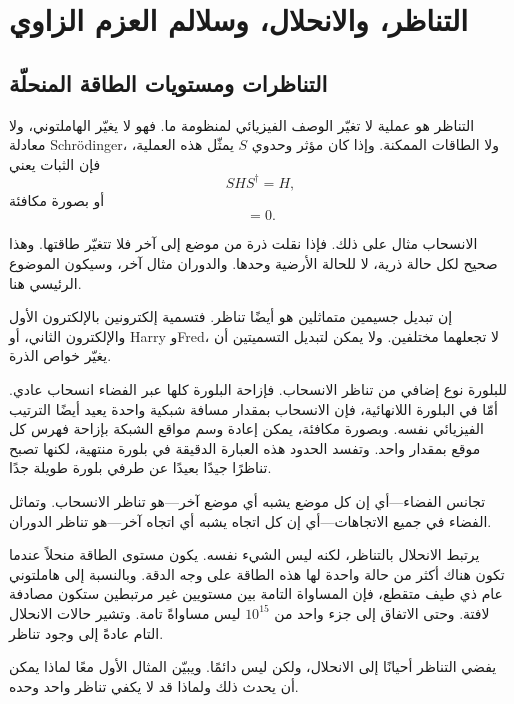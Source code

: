 \chapter{التناظر، والانحلال، وسلالم العزم الزاوي}
\providecommand{\ket}[1]{\left\lvert#1\right\rangle}

\section{التناظرات ومستويات الطاقة المنحلّة}

التناظر هو عملية لا تغيّر الوصف الفيزيائي لمنظومة ما. فهو لا يغيّر الهاملتوني، ولا معادلة Schr\"odinger، ولا الطاقات الممكنة. وإذا كان مؤثر وحدوي \(S\) يمثّل هذه العملية، فإن الثبات يعني
\begin{equation}
S H S^\dagger=H,
\end{equation}
أو بصورة مكافئة
\begin{equation}
[S,H]=0.
\end{equation}

الانسحاب مثال على ذلك. فإذا نقلت ذرة من موضع إلى آخر فلا تتغيّر طاقتها. وهذا صحيح لكل حالة ذرية، لا للحالة الأرضية وحدها. والدوران مثال آخر، وسيكون الموضوع الرئيسي هنا.

إن تبديل جسيمين متماثلين هو أيضًا تناظر. فتسمية إلكترونين بالإلكترون الأول والإلكترون الثاني، أو Harry وFred، لا تجعلهما مختلفين. ولا يمكن لتبديل التسميتين أن يغيّر خواص الذرة.

للبلورة نوع إضافي من تناظر الانسحاب. فإزاحة البلورة كلها عبر الفضاء انسحاب عادي. أمّا في البلورة اللانهائية، فإن الانسحاب بمقدار مسافة شبكية واحدة يعيد أيضًا الترتيب الفيزيائي نفسه. وبصورة مكافئة، يمكن إعادة وسم مواقع الشبكة بإزاحة فهرس كل موقع بمقدار واحد. وتفسد الحدود هذه العبارة الدقيقة في بلورة منتهية، لكنها تصبح تناظرًا جيدًا بعيدًا عن طرفي بلورة طويلة جدًا.

تجانس الفضاء---أي إن كل موضع يشبه أي موضع آخر---هو تناظر الانسحاب. وتماثل الفضاء في جميع الاتجاهات---أي إن كل اتجاه يشبه أي اتجاه آخر---هو تناظر الدوران.

يرتبط الانحلال بالتناظر، لكنه ليس الشيء نفسه. يكون مستوى الطاقة منحلاً عندما تكون هناك أكثر من حالة واحدة لها هذه الطاقة على وجه الدقة. وبالنسبة إلى هاملتوني عام ذي طيف متقطع، فإن المساواة التامة بين مستويين غير مرتبطين ستكون مصادفة لافتة. وحتى الاتفاق إلى جزء واحد من \(10^{15}\) ليس مساواةً تامة. وتشير حالات الانحلال التام عادةً إلى وجود تناظر.

يفضي التناظر أحيانًا إلى الانحلال، ولكن ليس دائمًا. ويبيّن المثال الأول معًا لماذا يمكن أن يحدث ذلك ولماذا قد لا يكفي تناظر واحد وحده.

